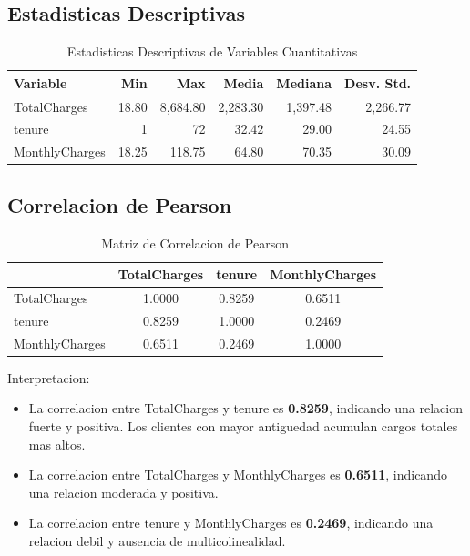\documentclass[12pt,a4paper]{article}
\begin{document}
\subsection{Estadisticas Descriptivas}

\begin{table}[H]
\centering
\caption{Estadisticas Descriptivas de Variables Cuantitativas}
\begin{tabular}{lrrrrr}
\toprule
\textbf{Variable} & \textbf{Min} & \textbf{Max} & \textbf{Media} & \textbf{Mediana} & \textbf{Desv. Std.} \\
\midrule
TotalCharges & 18.80 & 8,684.80 & 2,283.30 & 1,397.48 & 2,266.77 \\
tenure & 1 & 72 & 32.42 & 29.00 & 24.55 \\
MonthlyCharges & 18.25 & 118.75 & 64.80 & 70.35 & 30.09 \\
\bottomrule
\end{tabular}
\end{table}

\subsection{Correlacion de Pearson}

\begin{table}[H]
\centering
\caption{Matriz de Correlacion de Pearson}
\begin{tabular}{lccc}
\toprule
 & \textbf{TotalCharges} & \textbf{tenure} & \textbf{MonthlyCharges} \\
\midrule
TotalCharges & 1.0000 & 0.8259 & 0.6511 \\
tenure & 0.8259 & 1.0000 & 0.2469 \\
MonthlyCharges & 0.6511 & 0.2469 & 1.0000 \\
\bottomrule
\end{tabular}
\end{table}

Interpretacion:
\begin{itemize}
    \item La correlacion entre TotalCharges y tenure es \textbf{0.8259}, indicando una relacion fuerte y positiva. Los clientes con mayor antiguedad acumulan cargos totales mas altos.
    
    \item La correlacion entre TotalCharges y MonthlyCharges es \textbf{0.6511}, indicando una relacion moderada y positiva.
    
    \item La correlacion entre tenure y MonthlyCharges es \textbf{0.2469}, indicando una relacion debil y ausencia de multicolinealidad.
\end{itemize}
\end{document}
